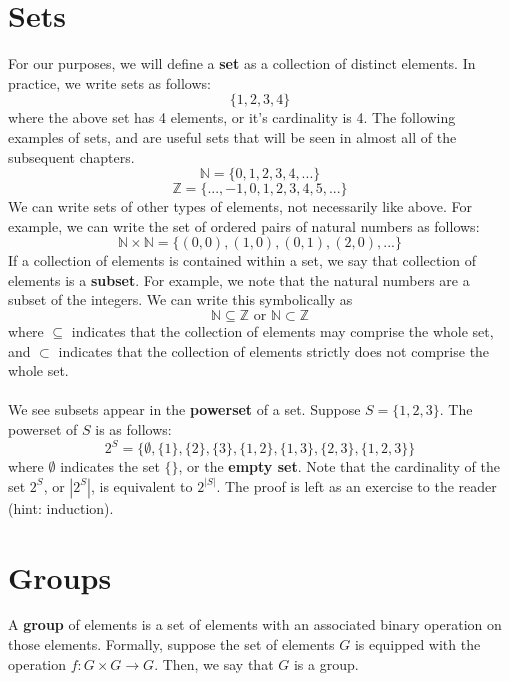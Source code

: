 \documentclass[11pt]{report}
\newcommand{\Z}{\mathbb{Z}}
\newcommand{\N}{\mathbb{N}}
\begin{document}
\section{Sets}
For our purposes, we will define a \textbf{set} as a collection of distinct elements. In practice, we write sets as follows:
$$\{1,2,3,4\}$$
where the above set has 4 elements, or it's cardinality is 4. The following examples of sets, and are useful sets that will be seen in almost all of the subsequent chapters.
$$\N = \{0,1,2,3,4,...\}$$
$$\Z = \{...,-1,0,1,2,3,4,5,...\}$$
We can write sets of other types of elements, not necessarily like above. For example, we can write the set of ordered pairs of natural numbers as follows:
$$\N \times \N = \{(0,0), (1,0), (0,1), (2,0), ...\}$$
If a collection of elements is contained within a set, we say that collection of elements is a \textbf{subset}. For example, we note that the natural numbers are a subset of the integers. We can write this symbolically as
$$\N \subseteq \Z \text{ or } \N \subset \Z $$
where $\subseteq$ indicates that the collection of elements may comprise the whole set, and $\subset$ indicates that the collection of elements strictly does not comprise the whole set.
\\ \\
We see subsets appear in the \textbf{powerset} of a set. Suppose $S = \{1,2,3\}$. The powerset of $S$ is as follows:
$$2^S = \{\emptyset, \{1\}, \{2\}, \{3\}, \{1,2\}, \{1,3\}, \{2,3\}, \{1,2,3\}\}$$
where $\emptyset$ indicates the set $\{\}$, or the \textbf{empty set}. Note that the cardinality of the set $2^S$, or $|2^S|$, is equivalent to $2^{|S|}$. The proof is left as an exercise to the reader (hint: induction).
\section{Groups}
A \textbf{group} of elements is a set of elements with an associated binary operation on those elements. Formally, suppose the set of elements $G$ is equipped with the operation $f: G \times G \rightarrow G$. Then, we say that $G$ is a group.
\end{document}
